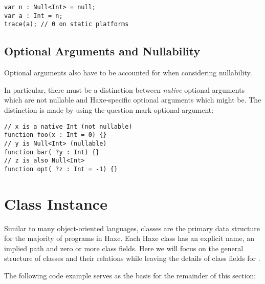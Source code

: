 \begin{lstlisting}
var n : Null<Int> = null;
var a : Int = n;
trace(a); // 0 on static platforms
\end{lstlisting}



\subsection{Optional Arguments and Nullability}
\label{types-nullability-optional-arguments}

Optional arguments also have to be accounted for when considering nullability.

In particular, there must be a distinction between \emph{native} optional arguments which are not nullable and Haxe-specific optional arguments which might be. The distinction is made by using the question-mark optional argument:

\begin{lstlisting}
// x is a native Int (not nullable)
function foo(x : Int = 0) {}
// y is Null<Int> (nullable)
function bar( ?y : Int) {}
// z is also Null<Int>
function opt( ?z : Int = -1) {}
\end{lstlisting}


\section{Class Instance}
\label{types-class-instance}

Similar to many object-oriented languages, classes are the primary data structure for the majority of programs in Haxe. Each Haxe class has an explicit name, an implied path and zero or more class fields. Here we will focus on the general structure of classes and their relations while leaving the details of class fields for .

The following code example serves as the basis for the remainder of this section:

